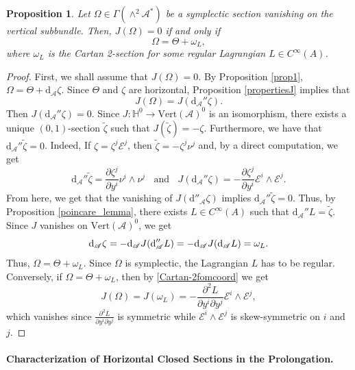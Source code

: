 \documentclass[12pt,letterpaper]{article}
\newcommand{\A}{\mathscr{A}}
\let\oldd\d
\renewcommand{\d}{%
  \relax\ifmmode\mathrm{d}\else\oldd\fi
}
\newtheorem{proposition}[theorem]{Proposition}
\numberwithin{equation}{section}
\begin{document}
\begin{proposition}\label{prop2}
Let $\Omega \in \Gamma(\wedge^2 \mathscr{A}^* ) $ be a symplectic section vanishing on the vertical subbundle. Then, $J(\Omega)=0$ if and only if 
$$ \Omega = \Theta + \omega_L, $$ 
where $\omega_L$ is the Cartan 2-section for some regular Lagrangian $L\in C^\infty(A)$.


\end{proposition}
\begin{proof}
First, we shall assume that $J(\Omega) =0$. By Proposition \ref{prop1}, $\Omega = \Theta + \mathrm{ d}_{\mathscr{A}} \zeta$. 
Since $\Theta$ and $\zeta$ are horizontal, Proposition \ref{propertiesJ} implies that
$$ J(\Omega) = J( \mathrm{ d}_{\mathscr{A}}'' \zeta  ) .$$
Then $J( \mathrm{ d}_{\mathscr{A}}'' \zeta  )=0$. 
Since $J:\mathbb{H}^0\to\mathrm{Vert}(\mathscr{A})^0$ is an isomorphism, 
there exists a unique $(0,1)$-section $\widetilde{\zeta}$ such that $J(\widetilde{\zeta})=-\zeta$.
Furthermore, we have that $\mathrm{ d}_{\mathscr{A}}'' \widetilde{\zeta} =0 $. 
Indeed, If $\zeta =\zeta^{j}\mathcal{E}^{j}$, then $\widetilde{\zeta} = -\zeta^{j}\nu^{j}$ and, by a direct computation, we get 
$$ \mathrm{ d}_{\mathscr{A}}'' \widetilde{\zeta} = \frac{\partial \zeta^{j} }{\partial {y}^{i} }\nu^{i}\wedge\nu^{j} \ \ \ \ \text{and}\ \ \ \ J( \mathrm{ d}_{\mathscr{A}}'' \zeta  )= -\frac{\partial \zeta^{j} }{\partial {y}^{i} }\mathcal{E}^{i}\wedge \mathcal{E}^{j}.$$
From here, we get that the vanishing of $J(\mathrm{d}''_\A\zeta)$ implies $\mathrm{ d}_{\mathscr{A}}'' \widetilde{\zeta} =0$.
Thus, by Proposition \ref{poincare_lemma}, there exists $L\in C^\infty(A)$ such that $\mathrm{ d}_{\mathscr{A}}'' L =\widetilde{\zeta}$. 
Since $J$ vanishes on $\mathrm{Vert}(\mathscr{A})^0$, we get
\[
\d_\A\zeta = -\d_\A J(\d''_\A L) = -\d_\A J(\d_\A L) = \omega_L.
\]
Thus, $ \Omega = \Theta + \omega_L$. 
Since $\Omega$ is symplectic, the Lagrangian $L$ has to be regular. 
Conversely, if $ \Omega = \Theta + \omega_L $, then by \eqref{Cartan-2fomcoord} we get 
$$ J(\Omega) = J(\omega_L) = -\frac{\partial^2 L}{\partial y^i\partial y^j}\mathcal{E}^i\wedge\mathcal{E}^j, $$
which vanishes since $\frac{\partial^2 L}{\partial y^i\partial y^j}$ is symmetric while $\mathcal{E}^i\wedge\mathcal{E}^j$ is skew-symmetric on $i$ and $j$.
\end{proof}


\paragraph{Characterization of Horizontal Closed Sections in the Prolongation.}
\end{document}

